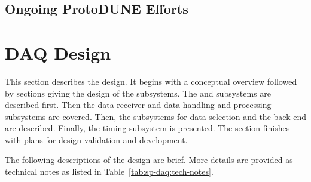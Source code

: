 


\subsection{Ongoing ProtoDUNE Efforts}


\section{DAQ Design}
\label{sec:fd-daq:design}


This section describes the  design. 
It begins with a conceptual overview followed by sections giving the design of the  subsystems. 
The  and  subsystems are described first.
Then the  data receiver and data handling and processing subsystems are covered.
Then, the subsystems for data selection and the  back-end are described. Finally, the timing subsystem is presented. The section finishes with plans for design validation and development.


The following descriptions of the design are brief. 
More details are provided as technical notes as listed in Table~\ref{tab:sp-daq:tech-notes}.

